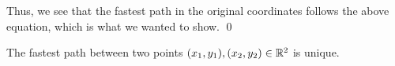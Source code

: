 Thus, we see that the fastest path in the original coordinates follows the above equation, which is what we wanted to show.
\qed


\begin{corollary}
  The fastest path between two points $(x_1, y_1), (x_2, y_2) \in \mathbb R^2$ is unique.
\end{corollary}


